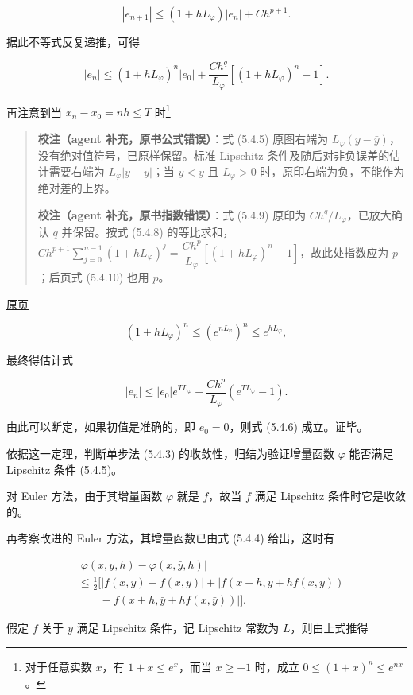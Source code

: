 \documentclass[
  10pt,
  fontset=fandol]{ctexart}
\begin{document}
\[
|e_{n+1}|\leqslant(1+hL_\varphi)|e_n|+Ch^{p+1}.\tag{5.4.8}
\]

据此不等式反复递推，可得

\[
|e_n|\leqslant(1+hL_\varphi)^n|e_0|+\frac{Ch^q}{L_\varphi}[(1+hL_\varphi)^n-1].\tag{5.4.9}
\]

再注意到当 \(x_n-x_0=nh\leqslant T\) 时\footnote{对于任意实数 \(x\)，有 \(1+x\leqslant e^x\)，而当 \(x\geqslant-1\) 时，成立 \(0\leqslant(1+x)^n\leqslant e^{nx}\)。}

\begin{quote}
\textbf{校注（agent 补充，原书公式错误）}：式 (5.4.5) 原图右端为 \(L_\varphi(y-\bar y)\)，没有绝对值符号，已原样保留。标准 Lipschitz 条件及随后对非负误差的估计需要右端为 \(L_\varphi|y-\bar y|\)；当 \(y<\bar y\) 且 \(L_\varphi>0\) 时，原印右端为负，不能作为绝对差的上界。

\textbf{校注（agent 补充，原书指数错误）}：式 (5.4.9) 原印为 \(Ch^q/L_\varphi\)，已放大确认 \(q\) 并保留。按式 (5.4.8) 的等比求和，\(Ch^{p+1}\sum_{j=0}^{n-1}(1+hL_\varphi)^j=\dfrac{Ch^p}{L_\varphi}[(1+hL_\varphi)^n-1]\)，故此处指数应为 \(p\)；后页式 (5.4.10) 也用 \(p\)。
\end{quote}

\href{../../source-images/pdf-135.jpeg}{原页}

\[
(1+hL_\varphi)^n\leqslant(e^{nL_\varphi})^n\leqslant e^{hL_\varphi},
\]

最终得估计式

\[
|e_n|\leqslant|e_0|e^{TL_\varphi}+\frac{Ch^p}{L_\varphi}(e^{TL_\varphi}-1).\tag{5.4.10}
\]

由此可以断定，如果初值是准确的，即 \(e_0=0\)，则式 (5.4.6) 成立。证毕。

依据这一定理，判断单步法 (5.4.3) 的收敛性，归结为验证增量函数 \(\varphi\) 能否满足 Lipschitz 条件 (5.4.5)。

对 Euler 方法，由于其增量函数 \(\varphi\) 就是 \(f\)，故当 \(f\) 满足 Lipschitz 条件时它是收敛的。

再考察改进的 Euler 方法，其增量函数已由式 (5.4.4) 给出，这时有

\[
\begin{aligned}
&|\varphi(x,y,h)-\varphi(x,\bar y,h)|\\
&\leqslant\frac12\bigl[|f(x,y)-f(x,\bar y)|+|f(x+h,y+hf(x,y))\\
&\qquad-f(x+h,\bar y+hf(x,\bar y))|\bigr].
\end{aligned}
\]

假定 \(f\) 关于 \(y\) 满足 Lipschitz 条件，记 Lipschitz 常数为 \(L\)，则由上式推得
\end{document}

